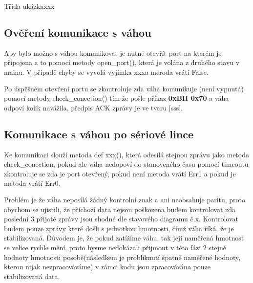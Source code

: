 Třída ukázkaxxx

\subsection{Ověření komunikace s váhou}
Aby bylo možno s váhou komunikovat je nutné otevřít port na kterém je připojena a to pomocí metody open\_port(), která je volána z druhého stavu v mainu. V případě chyby se vyvolá vyjímka xxxa meroda vrátí False.


Po úspěšném otevření portu se zkontroluje zda váha komunikuje (není vypnutá) pomocí metody check\_conection() tím že pošle příkaz \textbf{0xBH 0x70} a váha odpoví kolik navážila, předpis ACK zprávy je ve tvaru [sss].


\subsection{Komunikace s váhou po sériové lince}

Ke komunikaci slouží metoda def xxx(), která odesílá stejnou zprávu jako metoda check\_conection, pokud ale váha nedopoví do stanoveného času pomocí timeoutu zkontroluje se zda je port otevřený, pokud není metoda vrátí Err1 a pokud je metoda vrátí Err0.

Problém je že váha neposílá žádný kontrolní znak a ani neobsahuje paritu, proto abychom se ujistili, že příchozí data nejsou poškozena budem kontrolovat zda poslední 3 přijaté zprávy jsou shodné dle stavového diagramu č.x. Kontrolovat budem pouze zprávy které došli s jednotkou hmotnosti, čímž váha říká, že je stabilizovaná. Důvodem je, že pokud zatížíme váhu, tak její naměřená hmotnost se velice rychle mění, proto bysme nedokázali přijmout v této fázi 2 stejné hodnoty hmotnosti posobě(následkem je probliknutí špatně naměřené hodnoty, kterou nijak nezpracováváme) v rámci kodu jsou zpracovávána pouze stabilizovaná data.


